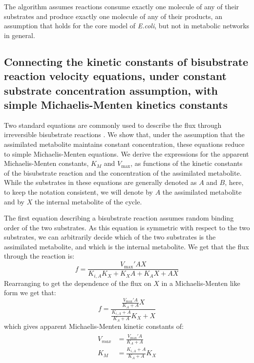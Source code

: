   The algorithm assumes reactions consume exactly one molecule of any of their substrates and produce exactly one molecule of any of their products, an assumption that holds for the core model of \emph{E.coli}, but not in metabolic networks in general.
  
  \subsection{Connecting the kinetic constants of bisubstrate reaction velocity equations, under constant substrate concentration assumption, with simple Michaelis-Menten kinetics constants}
  Two standard equations are commonly used to describe the flux through irreversible bisubstrate reactions \cite{Leskovac2003-li}.
  We show that, under the assumption that the assimilated metabolite maintains constant concentration, these equations reduce to simple Michaelis-Menten equations.
  We derive the expressions for the apparent Michaelis-Menten constants, $K_M$ and $V_{\max}$, as functions of the kinetic constants of the bisubstrate reaction and the concentration of the assimilated metabolite.
  While the substrates in these equations are generally denoted as $A$ and $B$, here, to keep the notation consistent, we will denote by $A$ the assimilated metabolite and by $X$ the internal metabolite of the cycle.

  The first equation describing a bisubstrate reaction assumes random binding order of the two substrates.
  As this equation is symmetric with respect to the two substrates, we can arbitrarily decide which of the two substrates is the assimilated metabolite, and which is the internal metabolite.
  We get that the flux through the reaction is:
  \begin{equation*}
      f=\frac{V_{\max}'AX}{K_{i,A}K_X+K_XA+K_AX+AX}
  \end{equation*}
  Rearranging to get the dependence of the flux on $X$ in a Michaelis-Menten like form we get that:
  \begin{equation*}
      f=\frac{\frac{V_{\max}'A}{K_A+A}X}{\frac{K_{i,A}+A}{K_A+A}K_X+X}
  \end{equation*}
  which gives apparent Michaelis-Menten kinetic constants of:
  \begin{align}
  \begin{split}
      \label{eq:paramssym}
      V_{max}&=\frac{V_{\max}'A}{K_A+A} \\
      K_M&=\frac{K_{i,A}+A}{K_A+A}K_X
  \end{split}
  \end{align}

